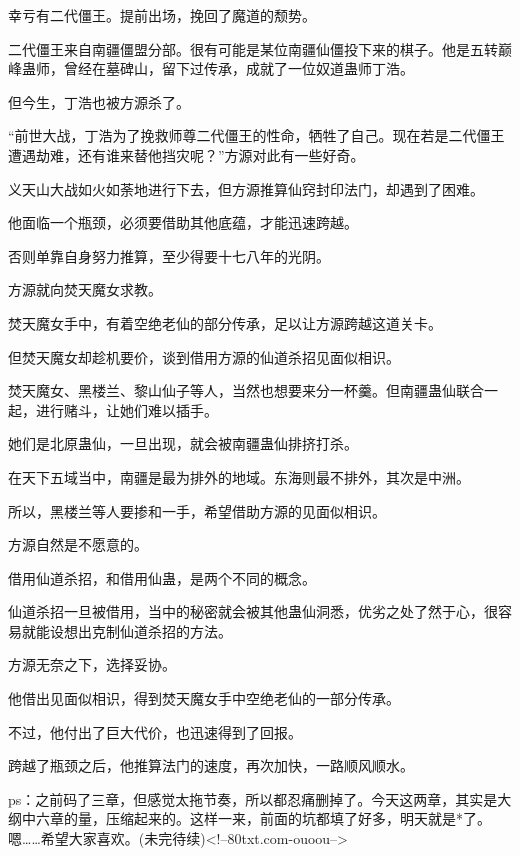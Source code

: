 \begin{this_body}
幸亏有二代僵王。提前出场，挽回了魔道的颓势。

二代僵王来自南疆僵盟分部。很有可能是某位南疆仙僵投下来的棋子。他是五转巅峰蛊师，曾经在墓碑山，留下过传承，成就了一位奴道蛊师丁浩。

但今生，丁浩也被方源杀了。

“前世大战，丁浩为了挽救师尊二代僵王的性命，牺牲了自己。现在若是二代僵王遭遇劫难，还有谁来替他挡灾呢？”方源对此有一些好奇。

义天山大战如火如荼地进行下去，但方源推算仙窍封印法门，却遇到了困难。

他面临一个瓶颈，必须要借助其他底蕴，才能迅速跨越。

否则单靠自身努力推算，至少得要十七八年的光阴。

方源就向焚天魔女求教。

焚天魔女手中，有着空绝老仙的部分传承，足以让方源跨越这道关卡。

但焚天魔女却趁机要价，谈到借用方源的仙道杀招见面似相识。

焚天魔女、黑楼兰、黎山仙子等人，当然也想要来分一杯羹。但南疆蛊仙联合一起，进行赌斗，让她们难以插手。

她们是北原蛊仙，一旦出现，就会被南疆蛊仙排挤打杀。

在天下五域当中，南疆是最为排外的地域。东海则最不排外，其次是中洲。

所以，黑楼兰等人要掺和一手，希望借助方源的见面似相识。

方源自然是不愿意的。

借用仙道杀招，和借用仙蛊，是两个不同的概念。

仙道杀招一旦被借用，当中的秘密就会被其他蛊仙洞悉，优劣之处了然于心，很容易就能设想出克制仙道杀招的方法。

方源无奈之下，选择妥协。

他借出见面似相识，得到焚天魔女手中空绝老仙的一部分传承。

不过，他付出了巨大代价，也迅速得到了回报。

跨越了瓶颈之后，他推算法门的速度，再次加快，一路顺风顺水。

ps：之前码了三章，但感觉太拖节奏，所以都忍痛删掉了。今天这两章，其实是大纲中六章的量，压缩起来的。这样一来，前面的坑都填了好多，明天就是*了。嗯……希望大家喜欢。(未完待续)<!--80txt.com-ouoou-->

\end{this_body}

